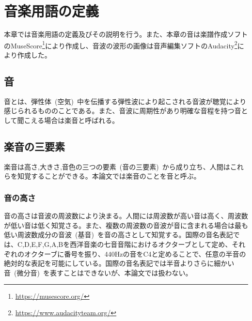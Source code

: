 \chapter{音楽用語の定義}

本章では音楽用語の定義及びその説明を行う。また、本章の音は楽譜作成ソフトのMuseScore\footnote{\url{https://musescore.org/}}により作成し、音波の波形の画像は音声編集ソフトのAudacity\footnote{\url{https://www.audacityteam.org/}}により作成した。

\section{音}

音とは、弾性体~(空気)~中を伝播する弾性波により起こされる音波が聴覚により感じられるもののことである。また、音波に周期性があり明確な音程を持つ音として聞こえる場合は楽音と呼ばれる。

\section{楽音の三要素}

楽音は高さ,大きさ,音色の三つの要素~(音の三要素)~から成り立ち、人間はこれらを知覚することができる。本論文では楽音のことを音と呼ぶ。

\subsection{音の高さ}

音の高さは音波の周波数により決まる。人間には周波数が高い音は高く、周波数が低い音は低く知覚さる。また、複数の周波数の音波が音に含まれる場合は最も低い周波数成分の音波~(基音)~を音の高さとして知覚する。国際の音名表記では、C,D,E,F,G,A,Bを西洋音楽の七音音階におけるオクターブとして定め、それぞれのオクターブに番号を振り、440Hzの音をC4と定めることで、任意の半音の絶対的な表記を可能にしている。国際の音名表記では半音よりさらに細かい音~(微分音)~を表すことはできないが、本論文では扱わない。

